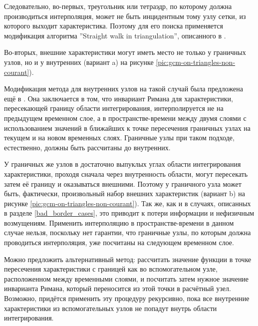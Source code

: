\documentclass[a4paper]{article}
\numberwithin{equation}{section}
\begin{document}
Следовательно, во-первых, треугольник или тетраэдр, 
по которому должна производиться интерполяция, 
может не быть инцидентным тому узлу сетки, из которого выходит характеристика. 
Поэтому для его поиска применяется модификация алгоритма ''Straight walk in triangulation'', 
описанного в \cite{line_walker}.

Во-вторых, внешние характеристики могут 
иметь место не только у граничных узлов, но и у внутренних 
(вариант a) на рисунке \ref{pic:gcm-on-triangles-non-courant}). 

Модификация метода для внутренних узлов на такой случай 
была предложена ещё в \cite{magomedov_kholodov_1988}. Она заключается в том, 
что инвариант Римана для характеристики, пересекающей границу области интегрирования, 
интерполируется не на предыдущем временном слое, а в пространстве-времени между двумя 
слоями с использованием значений в ближайших к точке пересечения граничных узлах 
на текущем и на новом временных слоях. Граничные узлы при таком подходе, 
естественно, должны быть рассчитаны до внутренних.

У граничных же узлов в достаточно выпуклых углах области интегрирования характеристики, 
проходя сначала через внутренность области, могут пересекать затем её границу 
и оказываться внешними. Поэтому у граничного узла может быть, фактически, 
произвольный набор внешних характеристик 
(вариант b) на рисунке \ref{pic:gcm-on-triangles-non-courant}). 
Так же, как и в случаях, описанных в разделе \ref{bad_border_cases}, 
это приводит к потери информации и нефизичным возмущениям. Применить 
интерполяцию в пространстве-времени в данном случае нельзя, поскольку 
нет гарантии, что граничные узлы, по которым должна проводиться интерполяция, 
уже посчитаны на следующем временном слое. 

Можно предложить альтернативный метод: рассчитать значение функции в точке пересечения 
характеристики с границей как во вспомогательном узле, 
расположенном между временными слоями, и посчитать затем нужное значение 
инварианта Римана, который переносится из этой точки в расчётный узел. 
Возможно, придётся применить эту процедуру рекурсивно, 
пока все внутренние характеристики из вспомогательных узлов не попадут внутрь 
области интегрирования. 
\end{document}
